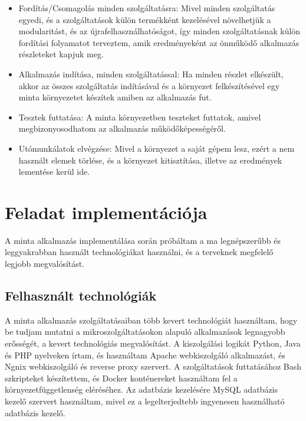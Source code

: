 \documentclass[11pt,magyar,a4paper,twoside,]{report}
\providecommand{\tightlist}{%
  \setlength{\itemsep}{0pt}\setlength{\parskip}{0pt}}
\begin{document}
\begin{itemize}
\tightlist
\item
  Fordítás/Csomagolás minden szolgáltatásra: Mivel minden szolgáltatás
  egyedi, és a szolgáltatások külön termékként kezelésével növelhetjük a
  modularitást, és az újrafelhasználhatóságot, így minden
  szolgáltatásnak külön fordítási folyamatot terveztem, amik
  eredményeként az önműködő alkalmazás részleteket kapjuk meg.
\item
  Alkalmazás indítása, minden szolgáltatással: Ha minden részlet
  elkészült, akkor az összes szolgáltatás indításával és a környezet
  felkészítésével egy minta környezetet készítek amiben az alkalmazás
  fut.
\item
  Tesztek futtatása: A minta környezetben teszteket futtatok, amivel
  megbizonyosodhatom az alkalmazás működőképességéről.
\item
  Utómunkálatok elvégzése: Mivel a környezet a saját gépem lesz, ezért a
  nem használt elemek törlése, és a környezet kitisztítása, illetve az
  eredmények lementése kerül ide.
\end{itemize}

\chapter{Feladat implementációja}\label{feladat-implementuxe1ciuxf3ja}

A minta alkalmazás implementálása során próbáltam a ma legnépszerűbb és
leggyakrabban használt technológiákat használni, és a terveknek
megfelelő legjobb megvalósítást.

\section{Felhasznált
technológiák}\label{felhasznuxe1lt-technoluxf3giuxe1k}

A minta alkalmazás szolgáltatásaiban több kevert technológiát
használtam, hogy be tudjam mutatni a mikroszolgáltatásokon alapuló
alkalmazások legnagyobb erősségét, a kevert technológiás megvalósítást.
A kiszolgálási logikát Python, Java és PHP nyelveken írtam, és
használtam Apache webkiszolgáló alkalmazást, és Ngnix webkiszolgáló és
reverse proxy szervert. A szolgáltatások futtatásához Bash szkripteket
készítettem, és Docker konténereket használtam fel a
környezetfüggetlenség eléréséhez. Az adatbázis kezelésére MySQL
adatbázis kezelő szervert használtam, mivel ez a legelterjedtebb
ingyenesen használható adatbázis kezelő.
\end{document}

